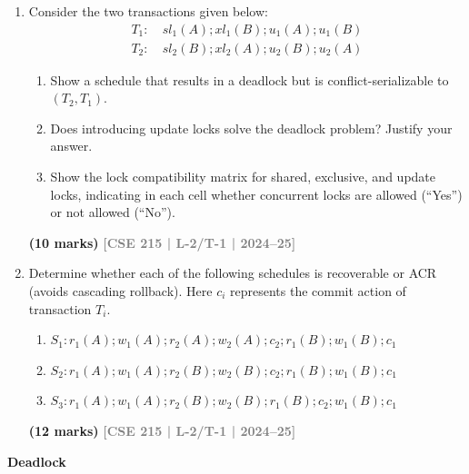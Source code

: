 \documentclass[12pt,a3paper]{article}
\newcommand{\yr}[1]{\hfill\textcolor{gray}{\small\textbf{[#1]}}}
\newcommand{\mk}[1]{\textcolor{orange!70!black}{\small\textbf{(#1 marks)}}}
\newcommand{\subtopic}[2]{%
  \vspace{10pt}
  \noindent\begin{tcolorbox}[colback=#1!8,colframe=#1,boxrule=0.6pt,arc=4pt,
    left=6pt,right=6pt,top=4pt,bottom=4pt]
    \small\bfseries\textcolor{#1}{#2}
  \end{tcolorbox}
  \vspace{2pt}
}
\begin{document}
\begin{enumerate}
\item Consider the two transactions given below:
\begin{align*}
T_1\colon &\ sl_1(A); xl_1(B); u_1(A); u_1(B)\\
T_2\colon &\ sl_2(B); xl_2(A); u_2(B); u_2(A)
\end{align*}
\begin{enumerate}
  \item Show a schedule that results in a deadlock but is conflict-serializable to $(T_2, T_1)$.
  \item Does introducing update locks solve the deadlock problem? Justify your answer.
  \item Show the lock compatibility matrix for shared, exclusive, and update locks, indicating in each cell whether concurrent locks are allowed (``Yes'') or not allowed (``No'').
\end{enumerate}
\mk{10} \yr{CSE 215 | L-2/T-1 | 2024--25}

\item Determine whether each of the following schedules is recoverable or ACR (avoids cascading rollback). Here $c_i$ represents the commit action of transaction $T_i$.
\begin{enumerate}
  \item $S_1\colon r_1(A); w_1(A); r_2(A); w_2(A); c_2; r_1(B); w_1(B); c_1$
  \item $S_2\colon r_1(A); w_1(A); r_2(B); w_2(B); c_2; r_1(B); w_1(B); c_1$
  \item $S_3\colon r_1(A); w_1(A); r_2(B); w_2(B); r_1(B); c_2; w_1(B); c_1$
\end{enumerate}
  \mk{12} \yr{CSE 215 | L-2/T-1 | 2024--25}

\end{enumerate}

\subtopic{cE}{Deadlock}
\label{sub:s7-deadlock}
\end{document}
